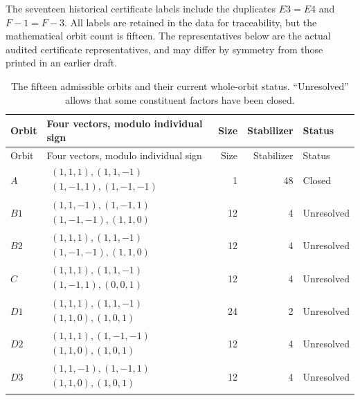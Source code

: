 \documentclass[11pt,letterpaper]{article}
\theoremstyle{definition}\newtheorem{definition}[theorem]{Definition}
\theoremstyle{remark}\newtheorem{remark}[theorem]{Remark}
\begin{document}
The seventeen historical certificate labels include the duplicates $E3=E4$ and $F{-}1=F{-}3$. All labels are retained in the data for traceability, but the mathematical orbit count is fifteen. The representatives below are the actual audited certificate representatives, and may differ by symmetry from those printed in an earlier draft.

\begin{longtable}{l m{2.80in}rrl}
\caption{The fifteen admissible orbits and their current whole-orbit status. ``Unresolved'' allows that some constituent factors have been closed.}\label{tab:orbits}\\
\toprule
Orbit & Four vectors, modulo individual sign & Size & Stabilizer & Status\\
\midrule\endfirsthead
\toprule
Orbit & Four vectors, modulo individual sign & Size & Stabilizer & Status\\
\midrule\endhead
$A$ & $\begin{gathered}(1,1,1),(1,1,-1)\\(1,-1,1),(1,-1,-1)\end{gathered}$ & 1 & 48 & Closed \\[3pt]
$B1$ & $\begin{gathered}(1,1,-1),(1,-1,1)\\(1,-1,-1),(1,1,0)\end{gathered}$ & 12 & 4 & Unresolved \\[3pt]
$B2$ & $\begin{gathered}(1,1,1),(1,1,-1)\\(1,-1,-1),(1,1,0)\end{gathered}$ & 12 & 4 & Unresolved \\[3pt]
$C$ & $\begin{gathered}(1,1,1),(1,1,-1)\\(1,-1,1),(0,0,1)\end{gathered}$ & 12 & 4 & Unresolved \\[3pt]
$D1$ & $\begin{gathered}(1,1,1),(1,1,-1)\\(1,1,0),(1,0,1)\end{gathered}$ & 24 & 2 & Unresolved \\[3pt]
$D2$ & $\begin{gathered}(1,1,1),(1,-1,-1)\\(1,1,0),(1,0,1)\end{gathered}$ & 12 & 4 & Unresolved \\[3pt]
$D3$ & $\begin{gathered}(1,1,-1),(1,-1,1)\\(1,1,0),(1,0,1)\end{gathered}$ & 12 & 4 & Unresolved \\[3pt]

\end{longtable}
\end{document}
